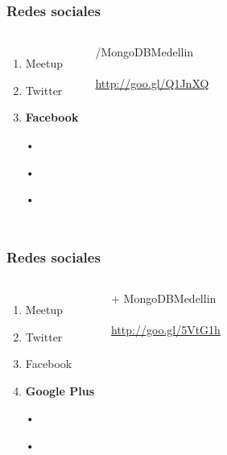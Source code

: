 \documentclass{beamer}
\begin{document}
\begin{frame}
\frametitle{Redes sociales}
\begin{columns}[c] %

\begin{enumerate}
\item Meetup
\item Twitter
\item \textbf{Facebook}
\item[•]	
\item[•]	
\item[•]	
\end{enumerate}

{\color{blue}/MongoDBMedellin}
\\~\\
{\color{blue}\url{http://goo.gl/Q1JnXQ}}
\end{columns}
\end{frame}
\begin{frame}
\frametitle{Redes sociales}
\begin{columns}[c] %

\begin{enumerate}
\item Meetup
\item Twitter
\item Facebook
\item \textbf{Google Plus}
\item[•]	
\item[•]	
\end{enumerate}

{\color{blue}+ MongoDBMedellin}
\\~\\
{\color{blue}\url{http://goo.gl/5VtG1h}}
\end{columns}
\end{frame}
\end{document}
